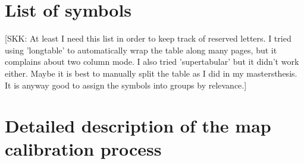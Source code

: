 \documentclass{aa}
\newcommand{\skk}[1]{\textcolor{midorange}{[SKK: #1]}} %
\newcommand{\RA}{{\mathsf{RA}}}
\newcommand{\Dec}{{\mathsf{Dec}}}
\begin{document}



\appendix
\FloatBarrier

\section{List of symbols} \label{sect:sym}

\skk{At least I need this list in order to keep track of reserved letters. I tried using 'longtable' to automatically 
wrap the table along many pages, but it complains about two column mode. I also tried 'supertabular' but it didn't work 
either. Maybe it is best to manually split the table as I did in my mastersthesis. It is anyway good to assign the 
symbols into groups by relevance.}
\setlength{\extrarowheight}{3pt}
\def\tabularxcolumn#1{m{#1}}
\newcommand{\symtable}[2]{\begin{table} \caption{#1} \begin{tabularx}{\textwidth}{lX} #2 \end{tabularx} \end{table}}


\FloatBarrier

\section{Detailed description of the map calibration process} \label{sect:detailed_calib}

  
\end{document}

